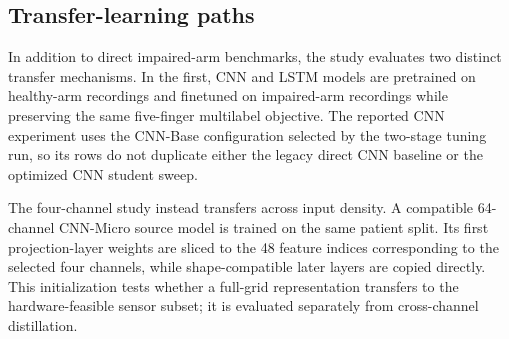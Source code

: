 \subsection{Transfer-learning paths}

In addition to direct impaired-arm benchmarks, the study evaluates two distinct transfer mechanisms. In the first, CNN and LSTM models are pretrained on healthy-arm recordings and finetuned on impaired-arm recordings while preserving the same five-finger multilabel objective. The reported CNN experiment uses the CNN-Base configuration selected by the two-stage tuning run, so its rows do not duplicate either the legacy direct CNN baseline or the optimized CNN student sweep.

The four-channel study instead transfers across input density. A compatible 64-channel CNN-Micro source model is trained on the same patient split. Its first projection-layer weights are sliced to the 48 feature indices corresponding to the selected four channels, while shape-compatible later layers are copied directly. This initialization tests whether a full-grid representation transfers to the hardware-feasible sensor subset; it is evaluated separately from cross-channel distillation.
